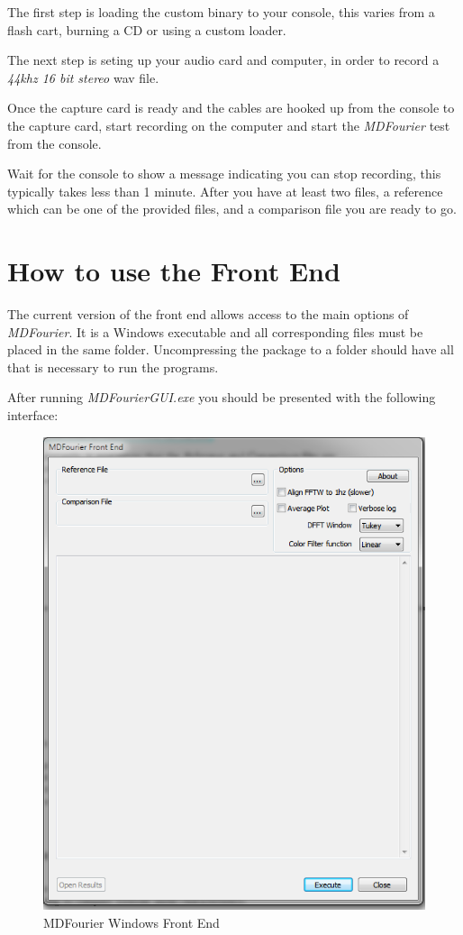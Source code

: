 \documentclass[10pt,a4paper]{report}
\begin{document}
The first step is loading the custom binary to your console, this varies from a flash cart, burning a CD or using a custom loader.

The next step is seting up your audio card and computer, in order to record a \textit{44khz 16 bit stereo} wav file.

Once the capture card is ready and the cables are hooked up from the console to the capture card, start recording on the computer and start the \textit{MDFourier} test from the console.

Wait for the console to show a message indicating you can stop recording, this typically takes less than 1 minute. After you have at least two files, a reference which can be one of the provided files, and a comparison file you are ready to go. 

\chapter{How to use the Front End}
\label{usinggui}
The current version of the front end allows access to the main options of \textit{MDFourier}. It is a Windows executable and all corresponding files must be placed in the same folder. Uncompressing the package to a folder should have all that is necessary to run the programs.

After running \textit{MDFourierGUI.exe} you should be presented with the following interface:

\begin{figure}[H]
	\centering
	\includegraphics[width=0.6\linewidth]{plots/GUI1.png}
	\caption[Front End]{MDFourier Windows Front End}
	\label{fig:gui1}
\end{figure}
\end{document}
